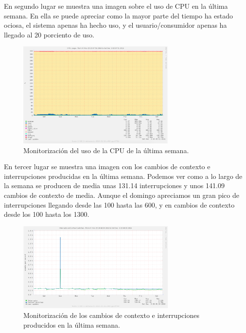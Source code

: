 En segundo lugar se muestra una imagen sobre el uso de CPU en la última semana. En ella se puede apreciar como la mayor parte del tiempo ha estado ociosa, el sistema apenas ha hecho uso, y el usuario/consumidor apenas ha llegado al 20 porciento de uso.
\begin{figure}[H]
	\begin{center}
		\includegraphics[width=0.7\textwidth]{Imagenes/Monitorizacion_uso_cpu}
		\caption{Monitorización del uso de la CPU de la última semana.} \label{fig:20}
	\end{center}
\end{figure}

En tercer lugar se muestra una imagen con los cambios de contexto e interrupciones producidas en la última semana. Podemos ver como a lo largo de la semana se producen de media unas 131.14 interrupciones y unos 141.09 cambios de contexto de media. Aunque el domingo apreciamos un gran pico de interrupciones llegando desde las 100 hasta las 600, y en cambios de contexto desde los 100 hasta los 1300.

\begin{figure}[H]
	\begin{center}
		\includegraphics[width=0.7\textwidth]{Imagenes/Monitorizacion_cambios_contexto_interrupciones}
		\caption{Monitorización de los cambios de contexto e interrupciones producidos en la última semana.} \label{fig:21}
	\end{center}
\end{figure}

